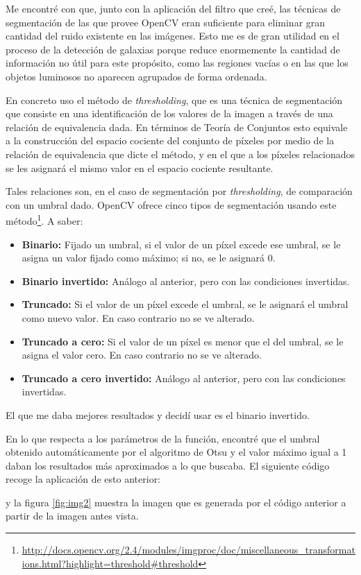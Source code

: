 \documentclass[a4paper,12pt]{article}
\begin{document}
Me encontré con que, junto con la aplicación del filtro que creé, las técnicas de segmentación de las que provee OpenCV eran suficiente para eliminar gran cantidad del ruido existente en las imágenes. Esto me es de gran utilidad en el proceso de la detección de galaxias porque reduce enormemente la cantidad de información no útil para este propósito, como las regiones vacías o en las que los objetos luminosos no aparecen agrupados de forma ordenada.

En concreto uso el método de \textit{thresholding}, que es una técnica de segmentación que consiste en una identificación de los valores de la imagen a través de una relación de equivalencia dada. En términos de Teoría de Conjuntos esto equivale a la construcción del espacio cociente del conjunto de píxeles por medio de la relación de equivalencia que dicte el método, y en el que a los píxeles relacionados se les asignará el mismo valor en el espacio cociente resultante.

Tales relaciones son, en el caso de segmentación por \textit{thresholding}, de comparación con un umbral dado. OpenCV ofrece cinco tipos de segmentación usando este método\footnote{\url{http://docs.opencv.org/2.4/modules/imgproc/doc/miscellaneous_transformations.html?highlight=threshold#threshold}}. A saber:

\begin{itemize}
\item \textbf{Binario:} Fijado un umbral, si el valor de un píxel excede ese umbral, se le asigna un valor fijado como máximo; si no, se le asignará 0.
\item \textbf{Binario invertido:} Análogo al anterior, pero con las condiciones invertidas.
\item \textbf{Truncado:} Si el valor de un píxel excede el umbral, se le asignará el umbral como nuevo valor. En caso contrario no se ve alterado.
\item \textbf{Truncado a cero:} Si el valor de un píxel es menor que el del umbral, se le asigna el valor cero. En caso contrario no se ve alterado.
\item \textbf{Truncado a cero invertido:} Análogo al anterior, pero con las condiciones invertidas.
\end{itemize}

El que me daba mejores resultados y decidí usar es el binario invertido.

En lo que respecta a los parámetros de la función, encontré que el umbral obtenido automáticamente por el algoritmo de Otsu y el valor máximo igual a 1 daban los resultados más aproximados a lo que buscaba.
El siguiente código recoge la aplicación de esto anterior:

y la figura \ref{fig:img2} muestra la imagen que es generada por el código anterior a partir de la imagen antes vista.
\end{document}
